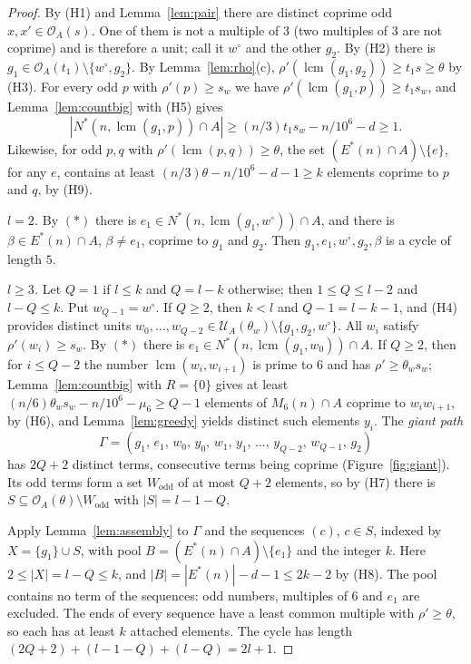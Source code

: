 \documentclass[11pt,a4paper]{article}
\theoremstyle{definition}
\theoremstyle{remark}
\DeclareMathOperator{\lcm}{lcm}
\newcommand{\Es}{E^{*}}
\newcommand{\OA}{\mathcal{O}_A}
\newcommand{\UA}{\mathcal{U}_A}
\begin{document}
\begin{proof}
By (H1) and Lemma~\ref{lem:pair} there are distinct coprime odd $x,x'\in\OA(s)$. One of them is not a
multiple of $3$ (two multiples of $3$ are not coprime) and is therefore a unit; call it $w^\circ$ and
the other $g_2$. By (H2) there is $g_1\in\OA(t_1)\setminus\{w^\circ,g_2\}$. By
Lemma~\ref{lem:rho}(c), $\rho'(\lcm(g_1,g_2))\ge t_1s\ge\theta$ by (H3). For every odd $p$ with
$\rho'(p)\ge s_w$ we have $\rho'(\lcm(g_1,p))\ge t_1s_w$, and Lemma~\ref{lem:countbig} with (H5)
gives
\[
  |N^*(n,\lcm(g_1,p))\cap A|\ge(n/3)t_1s_w-n/10^6-d\ge1. \tag{$*$}
\]
Likewise, for odd $p,q$ with $\rho'(\lcm(p,q))\ge\theta$, the set $(\Es(n)\cap A)\setminus\{e\}$, for
any $e$, contains at least $(n/3)\theta-n/10^6-d-1\ge k$ elements coprime to $p$ and $q$, by (H9).

\emph{$l=2$.} By $(*)$ there is $e_1\in N^*(n,\lcm(g_1,w^\circ))\cap A$, and there is
$\beta\in\Es(n)\cap A$, $\beta\ne e_1$, coprime to $g_1$ and $g_2$. Then $g_1,e_1,w^\circ,g_2,\beta$
is a cycle of length $5$.

\emph{$l\ge3$.} Let $Q=1$ if $l\le k$ and $Q=l-k$ otherwise; then $1\le Q\le l-2$ and $l-Q\le k$. Put
$w_{Q-1}=w^\circ$. If $Q\ge2$, then $k<l$ and $Q-1=l-k-1$, and (H4) provides distinct units
$w_0,\dots,w_{Q-2}\in\UA(\theta_w)\setminus\{g_1,g_2,w^\circ\}$. All $w_i$ satisfy $\rho'(w_i)\ge
s_w$. By $(*)$ there is $e_1\in N^*(n,\lcm(g_1,w_0))\cap A$. If $Q\ge2$, then for $i\le Q-2$ the number
$\lcm(w_i,w_{i+1})$ is prime to $6$ and has $\rho'\ge\theta_ws_w$; Lemma~\ref{lem:countbig} with
$R=\{0\}$ gives at least $(n/6)\theta_ws_w-n/10^6-\mu_6\ge Q-1$ elements of $M_6(n)\cap A$ coprime to
$w_iw_{i+1}$, by (H6), and Lemma~\ref{lem:greedy} yields distinct such elements $y_i$. The
\emph{giant path}
\[
  \Gamma=(g_1,\,e_1,\,w_0,\,y_0,\,w_1,\,y_1,\,\dots,\,y_{Q-2},\,w_{Q-1},\,g_2)
\]
has $2Q+2$ distinct terms, consecutive terms being coprime (Figure~\ref{fig:giant}). Its odd terms
form a set $W_{\mathrm{odd}}$ of at most $Q+2$ elements, so by (H7) there is $S\subseteq\OA(\theta)
\setminus W_{\mathrm{odd}}$ with $|S|=l-1-Q$.

Apply Lemma~\ref{lem:assembly} to $\Gamma$ and the sequences $(c)$, $c\in S$, indexed by
$X=\{g_1\}\cup S$, with pool $B=(\Es(n)\cap A)\setminus\{e_1\}$ and the integer $k$. Here
$2\le|X|=l-Q\le k$, and $|B|=|\Es(n)|-d-1\le2k-2$ by (H8). The pool contains no term of the
sequences: odd numbers, multiples of $6$ and $e_1$ are excluded. The ends of every sequence have a
least common multiple with $\rho'\ge\theta$, so each has at least $k$ attached elements. The cycle has
length $(2Q+2)+(l-1-Q)+(l-Q)=2l+1$.
\end{proof}
\end{document}
